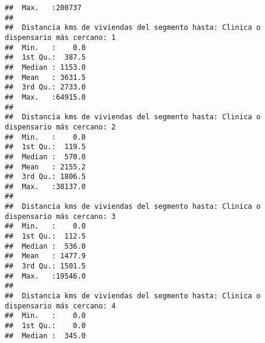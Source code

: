 \documentclass[11pt,]{article}
\begin{document}
\begin{verbatim}
##  Max.   :200737                                                                     
##                                                                                     
##  Distancia kms de viviendas del segmento hasta: Clinica o dispensario más cercano: 1
##  Min.   :    0.0                                                                    
##  1st Qu.:  387.5                                                                    
##  Median : 1153.0                                                                    
##  Mean   : 3631.5                                                                    
##  3rd Qu.: 2733.0                                                                    
##  Max.   :64915.0                                                                    
##                                                                                     
##  Distancia kms de viviendas del segmento hasta: Clinica o dispensario más cercano: 2
##  Min.   :    0.0                                                                    
##  1st Qu.:  119.5                                                                    
##  Median :  570.0                                                                    
##  Mean   : 2155.2                                                                    
##  3rd Qu.: 1806.5                                                                    
##  Max.   :38137.0                                                                    
##                                                                                     
##  Distancia kms de viviendas del segmento hasta: Clinica o dispensario más cercano: 3
##  Min.   :    0.0                                                                    
##  1st Qu.:  112.5                                                                    
##  Median :  536.0                                                                    
##  Mean   : 1477.9                                                                    
##  3rd Qu.: 1501.5                                                                    
##  Max.   :19546.0                                                                    
##                                                                                     
##  Distancia kms de viviendas del segmento hasta: Clinica o dispensario más cercano: 4
##  Min.   :    0.0                                                                    
##  1st Qu.:    0.0                                                                    
##  Median :  345.0                                                                    

\end{verbatim}
\end{document}
